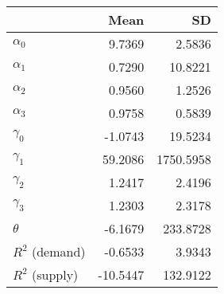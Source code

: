 
\begin{tabular}[t]{lrr}
\toprule
  & Mean & SD\\
\midrule
$\alpha_{0}$ & 9.7369 & 2.5836\\
$\alpha_{1}$ & 0.7290 & 10.8221\\
$\alpha_{2}$ & 0.9560 & 1.2526\\
$\alpha_{3}$ & 0.9758 & 0.5839\\
$\gamma_{0}$ & -1.0743 & 19.5234\\
$\gamma_{1}$ & 59.2086 & 1750.5958\\
$\gamma_{2}$ & 1.2417 & 2.4196\\
$\gamma_{3}$ & 1.2303 & 2.3178\\
$\theta$ & -6.1679 & 233.8728\\
$R^{2}$ (demand) & -0.6533 & 3.9343\\
$R^{2}$ (supply) & -10.5447 & 132.9122\\
\bottomrule
\end{tabular}
